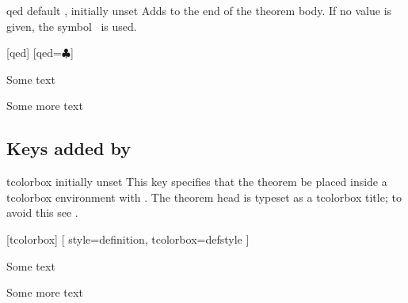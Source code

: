 \documentclass{ltxdoc}
\begin{document}
\begin{docKey}{qed}
  {}
  {default , initially unset}
Adds  to the end of the theorem body. If no value is given, the symbol \openbox\ is used.

\begin{tcbwritetemp}
[qed]
[qed=$\clubsuit$]
\end{tcbwritetemp}

\begin{keythmscode}[withpreamble]
\begin{example}
Some text
\end{example}
\begin{solution}
Some more text
\end{solution}
\end{keythmscode}

\end{docKey}

\subsection{Keys added by } \label{thm-added-keys}

\begin{docKey}{tcolorbox}
  {}
  {initially unset}
This key specifies that the theorem be placed inside a tcolorbox environment with .
The theorem head is typeset as a tcolorbox title; to avoid this see .

\begin{tcbwritetemp}
[tcolorbox]
[
  style=definition,
  tcolorbox={defstyle}
  ]
\end{tcbwritetemp}

\begin{keythmscode}[withpreamble]
\begin{corollary}
Some text
\end{corollary}
\begin{definition}
Some more text
\end{definition}
\end{keythmscode}

\end{docKey}
\end{document}
